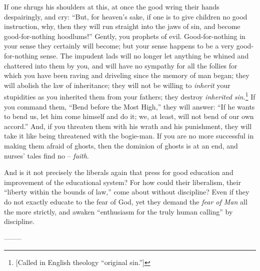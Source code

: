 If one shrugs his shoulders at this, at once the good wring their hands 
despairingly, and cry: ``But, for heaven's sake, if one is to give children 
no good instruction, why, then they will run straight into the jaws of sin, 
and become good-for-nothing hoodlums!'' Gently, you prophets of evil. 
Good-for-nothing in your sense they certainly will become; but your sense 
happens to be a very good-for-nothing sense. The impudent lads will no longer 
let anything be whined and chattered into them by you, and will have no 
sympathy for all the follies for which you have been raving and driveling 
since the memory of man began; they will abolish the law of inheritance; they 
will not be willing to \textit{inherit} your stupidities as you inherited them 
from your fathers; they destroy \textit{inherited sin}.\footnote{[Called in 
English theology ``original sin.'']} If you command them, ``Bend before the 
Most High,'' they will answer: ``If he wants to bend us, let him come 
himself and do it; we, at least, will not bend of our own accord.'' And, if 
you threaten them with his wrath and his punishment, they will take it like 
being threatened with the bogie-man. If you are no more successful in making 
them afraid of ghosts, then the dominion of ghosts is at an end, and nurses' 
tales find no -- \textit{faith}.

And is it not precisely the liberals again that press for good education and 
improvement of the educational system? For how could their liberalism, their 
``liberty within the bounds of law,'' come about without discipline? Even if 
they do not exactly educate to the fear of God, yet they demand the 
\textit{fear of Man} all the more strictly, and awaken ``enthusiasm for the 
truly human calling'' by discipline.

\begin{center}
--------\end{center}


